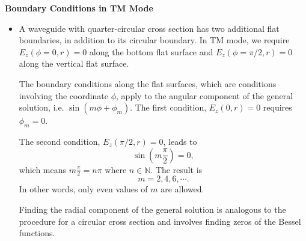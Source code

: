 \documentclass[11pt, a4paper]{article}
\begin{document}
\textbf{Boundary Conditions in TM Mode}
\begin{itemize}
    
	\item A waveguide with quarter-circular cross section has two additional flat boundaries, in addition to its circular boundary. In TM mode, we require $ E_{z}(\phi = 0, r) = 0 $ along the bottom flat surface and $ E_{z}(\phi = \pi/2, r) = 0 $ along the vertical flat surface. 
	
    The boundary conditions along the flat surfaces, which are conditions involving the coordinate $ \phi $, apply to the angular component of the general solution, i.e. $ \sin (m \phi + \phi_{m}) $. The first condition, $ E_{z}(0, r) = 0 $ requires $ \phi_{m} = 0 $. 

    The second condition, $ E_{z}(\pi/2, r) = 0 $, leads to
	\begin{equation*}
		\sin\left(m \frac{\pi}{2} \right) = 0,
	\end{equation*}
	which means $ m \frac{\pi}{2} = n \pi $ where $ n \in \mathbb{N} $. The result is
	\begin{equation*}
		m = 2, 4, 6, \cdots.
	\end{equation*}
	In other words, only even values of $ m $ are allowed.

    Finding the radial component of the general solution is analogous to the procedure for a circular cross section and involves finding zeros of the Bessel functions.
\end{itemize}
\end{document}
